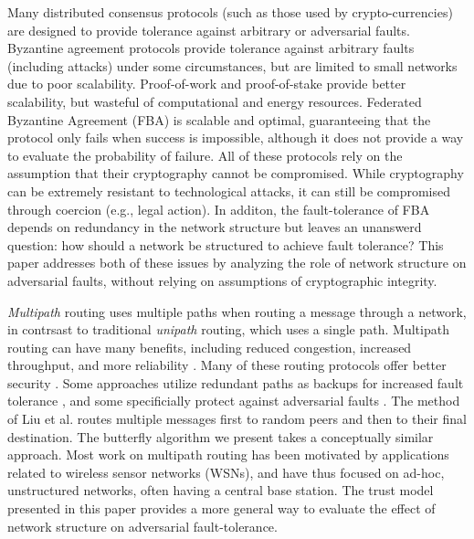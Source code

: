 \documentclass[prodmode,permissions]{acmsmall-ec16}
\begin{document}
Many distributed consensus protocols (such as those used by crypto-currencies)
are designed to provide tolerance against arbitrary or adversarial faults.
Byzantine agreement protocols
\cite{lamport_byzantine_1982,castro_practical_1999}
provide tolerance against arbitrary faults (including attacks) under
some circumstances, but are limited to small networks due to poor scalability.
Proof-of-work \cite{dwork_pricing_1993,nakamoto_bitcoin:_2008}
and proof-of-stake \cite{king_ppcoin:_2012}
provide better scalability, but wasteful of computational and energy
resources.
Federated Byzantine Agreement (FBA) \cite{mazieres_stellar_2015}
is scalable and optimal, guaranteeing that the protocol only fails when
success is impossible, although it does not provide a way to evaluate
the probability of failure.
All of these protocols rely on the assumption that their cryptography
cannot be compromised.
While cryptography can be extremely resistant to technological attacks,
it can still be compromised through coercion (e.g., legal action).
In additon, the fault-tolerance of FBA depends on redundancy in the network structure
but leaves an unanswerd question: how should a network be structured to achieve
fault tolerance?
This paper addresses both of these issues by analyzing the role of network
structure on adversarial faults, without relying on assumptions of cryptographic
integrity.

{\em Multipath} routing uses multiple paths when routing a message through a
network, in contrsast to traditional {\em unipath} routing, which uses
a single path.
Multipath routing can have many benefits, including reduced congestion,
increased throughput, and more reliability
\cite{qadir_exploiting_2015}.
Many of these routing protocols offer better security 
\cite{zin_survey_2015}.
Some approaches utilize redundant paths as backups for increased
fault tolerance
\cite{alrajeh_secure_2013},
and some specificially protect against adversarial faults
\cite{kohno_improvement_2012, khalil_unmask:_2010, lou_h-spread:_2006}.
The method of Liu et al.
\cite{liu_secure_2012}
routes multiple messages first to random peers and then
to their final destination.
The butterfly algorithm we present takes a conceptually similar approach.
Most work on multipath routing has been motivated by applications related to
wireless sensor networks (WSNs),
and have thus focused on ad-hoc, unstructured networks, often having a central
base station.
The trust model presented in this paper provides a more general way to evaluate
the effect of network structure on adversarial fault-tolerance.
\end{document}

